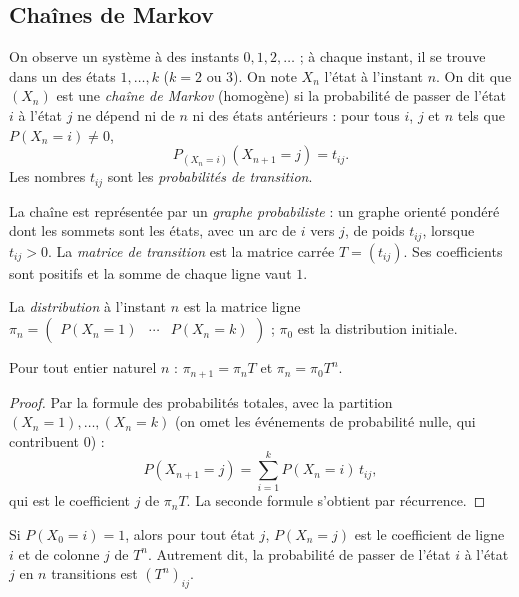 \subsection{Chaînes de Markov}
\begin{definition}
On observe un système à des instants $0,1,2,\dots$ ; à chaque instant, il se trouve dans un des états $1,\dots,k$ ($k=2$ ou $3$). On note $X_n$ l'état à l'instant $n$. On dit que $(X_n)$ est une \emph{chaîne de Markov} (homogène) si la probabilité de passer de l'état $i$ à l'état $j$ ne dépend ni de $n$ ni des états antérieurs : pour tous $i$, $j$ et $n$ tels que $P(X_n=i)\neq0$,
\[P_{(X_n=i)}(X_{n+1}=j)=t_{ij}.\]
Les nombres $t_{ij}$ sont les \emph{probabilités de transition}.
\end{definition}
\begin{definition}
La chaîne est représentée par un \emph{graphe probabiliste} : un graphe orienté pondéré dont les sommets sont les états, avec un arc de $i$ vers $j$, de poids $t_{ij}$, lorsque $t_{ij}>0$. La \emph{matrice de transition} est la matrice carrée $T=(t_{ij})$. Ses coefficients sont positifs et la somme de chaque ligne vaut $1$.
\end{definition}
\begin{definition}[Distribution]
La \emph{distribution} à l'instant $n$ est la matrice ligne $\pi_n=\begin{pmatrix}P(X_n=1)&\cdots&P(X_n=k)\end{pmatrix}$ ; $\pi_0$ est la distribution initiale.
\end{definition}
\begin{theorem}
Pour tout entier naturel $n$ : $\pi_{n+1}=\pi_nT$ et $\pi_n=\pi_0T^n$.
\end{theorem}
\begin{proof}
Par la formule des probabilités totales, avec la partition $\left(X_n=1\right),\dots,\left(X_n=k\right)$ (on omet les événements de probabilité nulle, qui contribuent $0$) :
\[P(X_{n+1}=j)=\sum_{i=1}^{k}P(X_n=i)\,t_{ij},\]
qui est le coefficient $j$ de $\pi_nT$. La seconde formule s'obtient par récurrence.
\end{proof}
\begin{theorem}
Si $P(X_0=i)=1$, alors pour tout état $j$, $P(X_n=j)$ est le coefficient de ligne $i$ et de colonne $j$ de $T^n$. Autrement dit, la probabilité de passer de l'état $i$ à l'état $j$ en $n$ transitions est $\left(T^n\right)_{ij}$.
\end{theorem}
